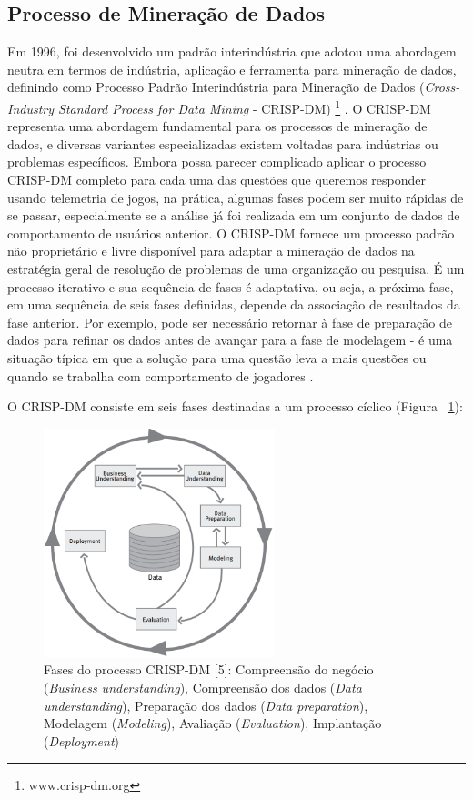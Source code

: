 \subsection{Processo de Mineração de Dados}
Em 1996, foi desenvolvido um padrão interindústria que adotou uma abordagem neutra em termos de indústria, aplicação e ferramenta para mineração de dados, definindo como Processo Padrão Interindústria para Mineração de Dados (\textit{Cross-Industry Standard Process for Data Mining} - CRISP-DM) \footnote{www.crisp-dm.org} \cite{chapman2000crisp}. O CRISP-DM representa uma abordagem fundamental para os processos de mineração de dados, e diversas variantes especializadas existem voltadas para indústrias ou problemas específicos. Embora possa parecer complicado aplicar o processo CRISP-DM completo para cada uma das questões que queremos responder usando telemetria de jogos, na prática, algumas fases podem ser muito rápidas de se passar, especialmente se a análise já foi realizada em um conjunto de dados de comportamento de usuários anterior. O CRISP-DM fornece um processo padrão não proprietário e livre disponível para adaptar a mineração de dados na estratégia geral de resolução de problemas de uma organização ou pesquisa. É um processo iterativo e sua sequência de fases é adaptativa, ou seja, a próxima fase, em uma sequência de seis fases definidas, depende da associação de resultados da fase anterior. Por exemplo, pode ser necessário retornar à fase de preparação de dados para refinar os dados antes de avançar para a fase de modelagem - é uma situação típica em que a solução para uma questão leva a mais questões ou quando se trabalha com comportamento de jogadores \cite{el2016game}.

O CRISP-DM consiste em seis fases destinadas a um processo cíclico (Figura ~\ref{fig:crisp-dm}):

\begin{figure}
  \centering
  \includegraphics[width=0.6\textwidth]{crisp-dm}%
  \caption{Fases do processo CRISP-DM [5]: Compreensão do negócio (\textit{Business understanding}), Compreensão dos dados (\textit{Data understanding}), Preparação dos dados (\textit{Data preparation}), Modelagem (\textit{Modeling}), Avaliação (\textit{Evaluation}), Implantação (\textit{Deployment})}
  \label{fig:crisp-dm}
\end{figure}

